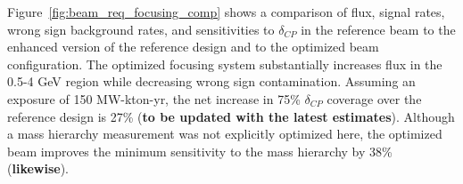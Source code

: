 

Figure~\ref{fig:beam_req_focusing_comp} shows a comparison of flux, signal rates, wrong sign background rates, and sensitivities to $\delta_{CP}$ in
the reference beam to the enhanced version of the reference design and to the optimized beam configuration.  The optimized focusing system substantially
increases flux in the 0.5-4 GeV region while decreasing wrong sign contamination.  Assuming an exposure of 150 MW-kton-yr, the net increase in 75\% $\delta_{CP}$ coverage 
over the reference design is 27\% ({\bf{to be updated with the latest estimates}}).  Although a mass hierarchy measurement was not explicitly optimized here, the optimized beam 
improves the minimum sensitivity to the mass hierarchy by 38\% ({\bf likewise}).   

